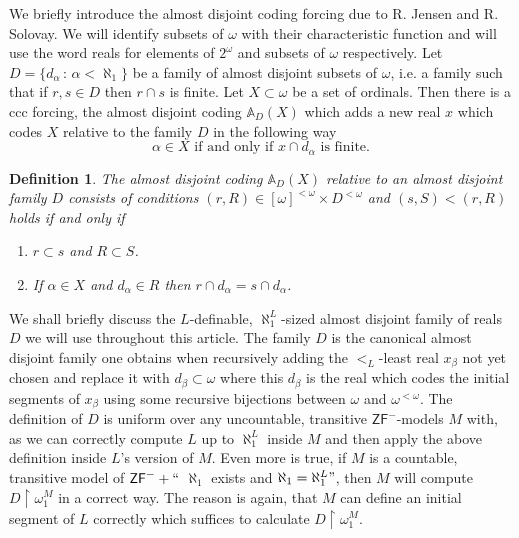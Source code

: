 \documentclass[a4paper,11pt]{article}
\newtheorem{definition}[theorem]{Definition}
\newcommand{\ZFP}{\mathsf{ZF}^-}
\begin{document}
We briefly introduce the almost disjoint coding forcing due to R. Jensen and R. Solovay. We will identify subsets of $\omega$ with their characteristic function and will use the word reals for elements of $2^{\omega}$ and subsets of $\omega$ respectively.
Let $D=\{d_{\alpha} \, : \, \alpha < \aleph_1 \}$ be a family of almost disjoint subsets of $\omega$, i.e. a family such that if $r, s \in D$ then 
$r \cap s$ is finite. Let $X\subset  \omega$  be a set of ordinals. Then there 
is a ccc forcing, the almost disjoint coding $\mathbb{A}_D(X)$ which adds 
a new real $x$ which codes $X$ relative to the family $D$ in the following way
$$\alpha \in X \text{ if and only if } x \cap d_{\alpha} \text{ is finite.}$$
\begin{definition}\label{definitionadcoding}
 The almost disjoint coding $\mathbb{A}_D(X)$ relative to an almost disjoint family $D$ consists of
 conditions $(r, R) \in [\omega]^{<\omega} \times D^{<\omega}$ and
 $(s,S) < (r,R)$ holds if and only if
 \begin{enumerate}
  \item $r \subset s$ and $R \subset S$.
  \item If $\alpha \in X$ and $d_{\alpha} \in R$ then $r \cap d_{\alpha} = s \cap d_{\alpha}$.
 \end{enumerate}
\end{definition}
We shall briefly discuss the $L$-definable, $\aleph_1^L$-sized almost disjoint family of reals $D$  we will use throughout this article. The family $D$ is the canonical almost disjoint family one obtains when recursively adding the $<_L$-least real $x_{\beta}$ not yet chosen and replace it with $d_{\beta} \subset \omega$ where this $d_{\beta}$  is the real which codes the initial segments of $x_{\beta}$ using some recursive bijections between $\omega$ and $\omega^{<\omega}$. The definition of $D$ is uniform over any uncountable, transitive $\ZFP$-models $M$ with, as we can correctly compute $L$ up to $\aleph_1^L$ inside $M$ and then apply the above definition inside $L$'s version of $M$. Even more is true, if $M$ is a countable, transitive model of $\ZFP+``$ $\aleph_1$ exists and $\aleph_1=\aleph_1^L"$, then $M$ will compute $D \upharpoonright \omega_1^M$ in a correct way. The reason is again, that $M$ can define an initial segment of $L$ correctly which suffices to calculate $D \upharpoonright \omega_1^M$.
\end{document}
